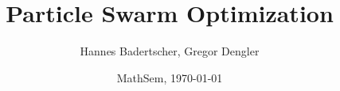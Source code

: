 \documentclass[xcolor=dvipsnames]{beamer}
\title{Particle Swarm Optimization}
\author[Badertscher, Dengler]{Hannes Badertscher, Gregor Dengler}
\date [MathSem, FS13]{MathSem, \today}
\begin{document}
	\begin{frame}
		\titlepage
	\end{frame}
  
	
	
	
	
	
\end{document}
